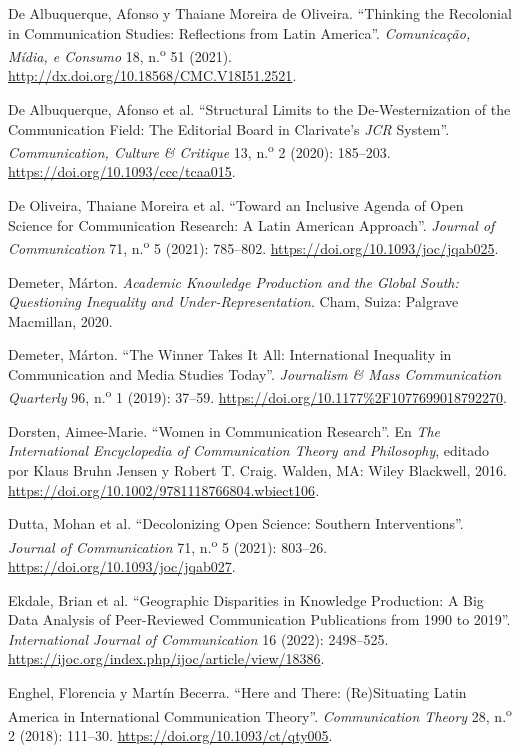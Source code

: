 \documentclass{tufte-handout}
\begin{document}
\begin{hangparas}{.25in}{1}
De Albuquerque, Afonso y Thaiane Moreira de Oliveira. ``Thinking the
Recolonial in Communication Studies: Reflections from Latin America''.
\emph{Comunicação, Mídia, e Consumo} 18, n.\textsuperscript{o} 51
(2021). \url{http://dx.doi.org/10.18568/CMC.V18I51.2521}.

De Albuquerque, Afonso et al. ``Structural Limits to the
De-Westernization of the Communication Field: The Editorial Board in
Clarivate's \emph{JCR} System''. \emph{Communication, Culture \&
Critique} 13, n.\textsuperscript{o} 2 (2020): 185--203.
\url{https://doi.org/10.1093/ccc/tcaa015}.

De Oliveira, Thaiane Moreira et al. ``Toward an Inclusive Agenda of Open
Science for Communication Research: A Latin American Approach''.
\emph{Journal of Communication} 71, n.\textsuperscript{o} 5 (2021):
785--802. \url{https://doi.org/10.1093/joc/jqab025}.

Demeter, Márton. \emph{Academic Knowledge Production and the Global
South: Questioning Inequality and Under-Representation}. Cham, Suiza:
Palgrave Macmillan, 2020.

Demeter, Márton. ``The Winner Takes It All: International Inequality in
Communication and Media Studies Today''. \emph{Journalism \& Mass
Communication Quarterly} 96, n.\textsuperscript{o} 1 (2019): 37--59.
\url{https://doi.org/10.1177\%2F1077699018792270}.

Dorsten, Aimee-Marie. ``Women in Communication Research''. En \emph{The
International Encyclopedia of Communication Theory and Philosophy},
editado por Klaus Bruhn Jensen y Robert T. Craig. Walden, MA: Wiley
Blackwell, 2016.
\url{https://doi.org/10.1002/9781118766804.wbiect106}\emph{.}

Dutta, Mohan et al. ``Decolonizing Open Science: Southern
Interventions''. \emph{Journal of Communication} 71,
n.\textsuperscript{o} 5 (2021): 803--26.
\url{https://doi.org/10.1093/joc/jqab027}.

Ekdale, Brian et al. ``Geographic Disparities in Knowledge Production: A
Big Data Analysis of Peer-Reviewed Communication Publications from 1990
to 2019''. \emph{International Journal of Communication} 16 (2022):
2498--525. \url{https://ijoc.org/index.php/ijoc/article/view/18386}.

Enghel, Florencia y Martín Becerra. ``Here and There: (Re)Situating
Latin America in International Communication Theory''.
\emph{Communication Theory} 28, n.\textsuperscript{o} 2 (2018): 111--30.
\url{https://doi.org/10.1093/ct/qty005}.


\end{hangparas}
\end{document}
